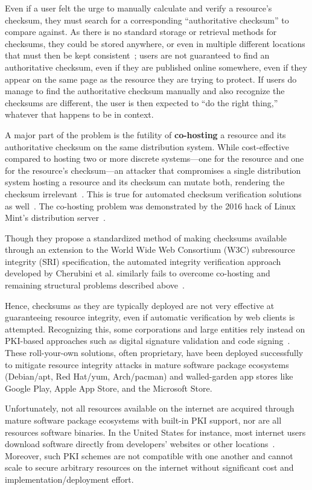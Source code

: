 Even if a user felt the urge to manually calculate and verify a resource's
checksum, they must search for a corresponding ``authoritative checksum'' to
compare against. As there is no standard storage or retrieval methods for
checksums, they could be stored anywhere, or even in multiple different
locations that must then be kept consistent~\cite{Cherubini}; users are not
guaranteed to find an authoritative checksum, even if they are published online
somewhere, even if they appear on the same page as the resource they are trying
to protect. If users do manage to find the authoritative checksum manually and
also recognize the checksums are different, the user is then expected to ``do
the right thing,'' whatever that happens to be in context.

A major part of the problem is the futility of \textbf{co-hosting} a resource
and its authoritative checksum on the same distribution system. While
cost-effective compared to hosting two or more discrete systems---one for the
resource and one for the resource's checksum---an attacker that compromises a
single distribution system hosting a resource and its checksum can mutate both,
rendering the checksum irrelevant~\cite{Stickler}. This is true for automated
checksum verification solutions as well~\cite{Cherubini}. The co-hosting problem
was demonstrated by the 2016 hack of Linux Mint's distribution
server~\cite{SCA-MINT1, SCA-MINT2}.

Though they propose a standardized method of making checksums available through
an extension to the World Wide Web Consortium (W3C) subresource integrity (SRI)
specification, the automated integrity verification approach developed by
Cherubini et al. similarly fails to overcome co-hosting and remaining structural
problems described above~\cite{Cherubini}.

Hence, checksums as they are typically deployed are not very effective at
guaranteeing resource integrity, even if automatic verification by web clients
is attempted. Recognizing this, some corporations and large entities rely
instead on PKI-based approaches such as digital signature validation and code
signing~\cite{PKI}. These roll-your-own solutions, often proprietary, have been
deployed successfully to mitigate resource integrity attacks in mature software
package ecosystems (\eg Debian/apt, Red Hat/yum, Arch/pacman) and walled-garden
app stores like Google Play, Apple App Store, and the Microsoft Store.

Unfortunately, not all resources available on the internet are acquired through
mature software package ecosystems with built-in PKI support, nor are all
resources software binaries. In the United States for instance, most internet
users download software directly from developers' websites or other
locations~\cite{Cherubini, File}. Moreover, such PKI schemes are not compatible
with one another and cannot scale to secure arbitrary resources on the internet
without significant cost and implementation/deployment effort.

